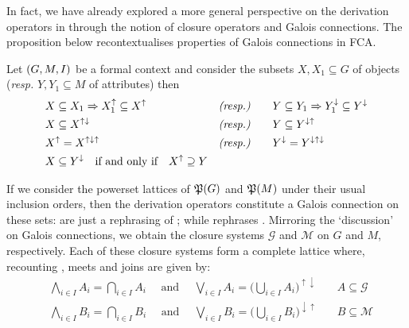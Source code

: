 In fact, we have already explored a more general perspective on the derivation operators in  through the notion
of closure operators and Galois connections. The proposition below recontextualises properties of Galois connections in FCA.

\begin{proposition}
  \label{proposition:derivation-operators-galois} Let $(G,M,\mathrel{I})$ be a formal context and consider the subsets $X,X_{1}\subseteq G$ of objects (\textit{resp.}
  $Y,Y_{1}\subseteq M$ of attributes) then
  \begin{align}
     & X \subseteq X_{1}\Rightarrow X_{1}^{\uparrow}\subseteq X^{\uparrow} & \textit{(resp.)}         & \qquad Y \subseteq Y_{1}\Rightarrow Y_{1}^{\downarrow}\subseteq Y^{\downarrow}\label{equation:galois-1} \\
     & X \subseteq X^{\uparrow \downarrow}                                 & \textit{(resp.)}         & \qquad Y \subseteq Y^{\downarrow \uparrow}\label{equation:galois-2}                                     \\
     & X^{\uparrow}= X^{\uparrow \downarrow \uparrow}                      & \textit{(resp.)}         & \qquad Y^{\downarrow}= Y^{\downarrow \uparrow \downarrow}\label{equation:galois-3}                      \\
     & X \subseteq Y^{\downarrow}\quad \text{if and only if}\quad X^{\uparrow}\supseteq Y             & \label{equation:galois-4}
  \end{align}
\end{proposition}

If we consider the powerset lattices of $\mathfrak{P}({G})$ and $\mathfrak{P}({M})$ under their usual inclusion orders, then the derivation operators
constitute a Galois connection on these sets:  are just a rephrasing of ;
while  rephrases . Mirroring the `discussion' on Galois connections, we obtain
the closure systems $\mathcal{G}$ and $\mathcal{M}$ on $G$ and $M$, respectively. Each of these closure systems form a complete lattice
where, recounting , meets and joins are given by:
%
\begin{align*}
   & \underset{i \in I}\bigwedge A_{i}= \underset{i \in I}\bigcap A_{i}\quad \text{ and }\quad \underset{i \in I}\bigvee A_{i}= \big(\underset{i \in I}\bigcup A_{i}\big)^{\uparrow \downarrow} & \quad A\subseteq \mathcal{G} \\
   & \underset{i \in I}\bigwedge B_{i}= \underset{i \in I}\bigcap B_{i}\quad \text{ and }\quad\underset{i \in I}\bigvee B_{i}= \big( \underset{i \in I}\bigcup B_{i}\big)^{\downarrow \uparrow} & \quad B\subseteq \mathcal{M}
\end{align*}

